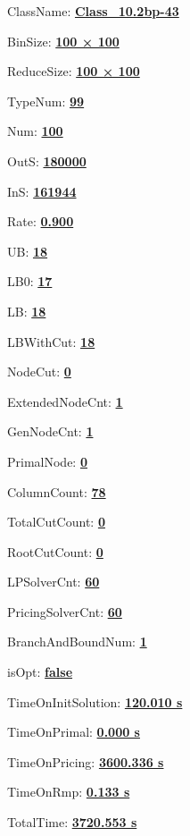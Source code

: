 \documentclass[11pt]{article}
\begin{document}
\pagestyle{empty}


ClassName: \underline{\textbf{Class_10.2bp-43}}
\par
BinSize: \underline{\textbf{100 × 100}}
\par
ReduceSize: \underline{\textbf{100 × 100}}
\par
TypeNum: \underline{\textbf{99}}
\par
Num: \underline{\textbf{100}}
\par
OutS: \underline{\textbf{180000}}
\par
InS: \underline{\textbf{161944}}
\par
Rate: \underline{\textbf{0.900}}
\par
UB: \underline{\textbf{18}}
\par
LB0: \underline{\textbf{17}}
\par
LB: \underline{\textbf{18}}
\par
LBWithCut: \underline{\textbf{18}}
\par
NodeCut: \underline{\textbf{0}}
\par
ExtendedNodeCnt: \underline{\textbf{1}}
\par
GenNodeCnt: \underline{\textbf{1}}
\par
PrimalNode: \underline{\textbf{0}}
\par
ColumnCount: \underline{\textbf{78}}
\par
TotalCutCount: \underline{\textbf{0}}
\par
RootCutCount: \underline{\textbf{0}}
\par
LPSolverCnt: \underline{\textbf{60}}
\par
PricingSolverCnt: \underline{\textbf{60}}
\par
BranchAndBoundNum: \underline{\textbf{1}}
\par
isOpt: \underline{\textbf{false}}
\par
TimeOnInitSolution: \underline{\textbf{120.010 s}}
\par
TimeOnPrimal: \underline{\textbf{0.000 s}}
\par
TimeOnPricing: \underline{\textbf{3600.336 s}}
\par
TimeOnRmp: \underline{\textbf{0.133 s}}
\par
TotalTime: \underline{\textbf{3720.553 s}}
\par
\newpage


\end{document}
